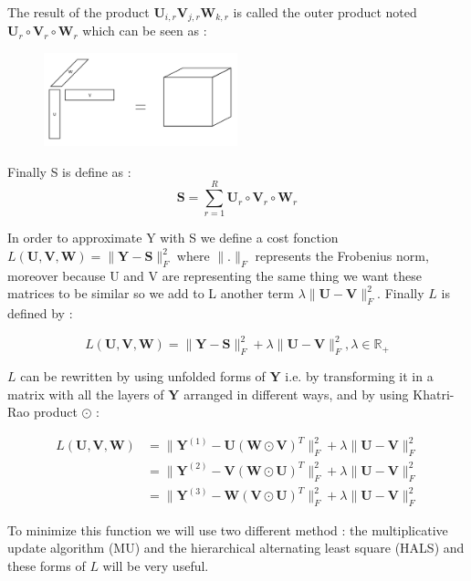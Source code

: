 \documentclass{article}
\begin{document}
The result of the product $\mathbf{U}_{i,r}\mathbf{V}_{j,r}\mathbf{W}_{k, r}$ is called the outer product noted $\mathbf{U}_r \circ \mathbf{V}_r \circ \mathbf{W}_r$ which can be seen as :

\begin{figure}[H]
    \centering
    \includegraphics[width=0.5\textwidth]{images/outer_product.png}
\end{figure}


Finally S is define as : 
\[
    \mathbf{S} = \sum_{r = 1}^R \mathbf{U}_r \circ \mathbf{V}_r \circ \mathbf{W}_r
\]

In order to approximate Y with S we define a cost fonction $L(\mathbf{U}, \mathbf{V}, \mathbf{W})=\|\mathbf{Y}-\mathbf{S}\|_{F}^2$ where $\|.\|_F$ represents the Frobenius norm,
moreover because U and V are representing the same thing we want these matrices to be similar so we add to L another term $\lambda\|\mathbf{U}-\mathbf{V}\|_{F}^2$.
 Finally $L$ is defined by :

\[
    L(\mathbf{U}, \mathbf{V}, \mathbf{W})=\|\mathbf{Y}-\mathbf{S}\|_{F}^2 +\lambda \|\mathbf{U}-\mathbf{V}\|_{F}^2, \lambda \in \mathbb{R}_+
\]

$L$ can be rewritten by using unfolded forms of $\mathbf{Y}$ i.e. by transforming it in a matrix with all the layers of $\mathbf{Y}$
arranged in different ways, and by using Khatri-Rao product $\odot$ :

\begin{align*}
L(\mathbf{U}, \mathbf{V}, \mathbf{W}) &= \|\mathbf{Y}^{(1)}-\mathbf{U}(\mathbf{W}\odot \mathbf{V})^{T}\|_{F}^2 +\lambda \|\mathbf{U}-\mathbf{V}\|_{F}^2 \\
                &= \|\mathbf{Y}^{(2)}-\mathbf{V}(\mathbf{W}\odot \mathbf{U})^{T}\|_{F}^2 +\lambda \|\mathbf{U}-\mathbf{V}\|_{F}^2\\
                &= \|\mathbf{Y}^{(3)}-\mathbf{W}(\mathbf{V}\odot \mathbf{U})^{T}\|_{F}^2 +\lambda \|\mathbf{U}-\mathbf{V}\|_{F}^2
\end{align*}

To minimize this function we will use two
different method : the multiplicative update algorithm (MU) and the hierarchical alternating least square (HALS) and these forms of
$L$ will be very useful.
\end{document}
